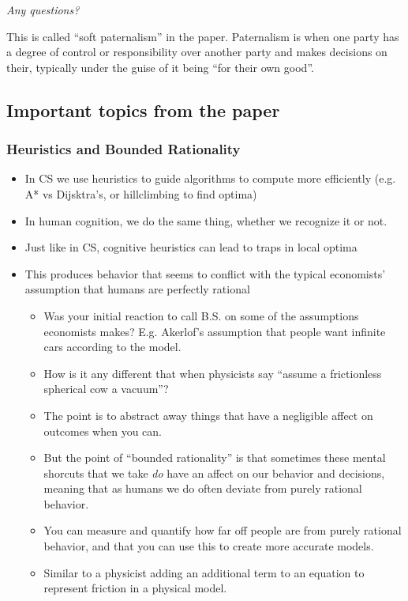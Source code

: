 \documentclass[11pt]{article}
\begin{document}
{\it Any questions?}

This is called ``soft paternalism'' in the paper. Paternalism is when one party has a degree of control or responsibility over another party and makes decisions on their, typically under the guise of it being ``for their own good''.

\subsection{Important topics from the paper}
\subsubsection{Heuristics and Bounded Rationality}

\begin{itemize}
    \item In CS we use heuristics to guide algorithms to compute more efficiently (e.g. A* vs Dijsktra's, or hillclimbing to find optima)
    \item In human cognition, we do the same thing, whether we recognize it or not. 
    \item Just like in CS, cognitive heuristics can lead to traps in local optima
    \item This produces behavior that seems to conflict with the typical economists' assumption that humans are perfectly rational
    \begin{itemize}
        \item Was your initial reaction to call B.S. on some of the assumptions economists makes? E.g. Akerlof's assumption that people want infinite cars according to the model.
        \item How is it any different that when physicists say ``assume a frictionless spherical cow a vacuum''?
        \item The point is to abstract away things that have a negligible affect on outcomes when you can.
        \item But the point of ``bounded rationality'' is that sometimes these mental shorcuts that we take \textit{do} have an affect on our behavior and decisions, meaning that as humans we do often deviate from purely rational behavior.
        \item You can measure and quantify how far off people are from purely rational behavior, and that you can use this to create more accurate models.
        \item Similar to a physicist adding an additional term to an equation to represent friction in a physical model.
    \end{itemize}
\end{itemize}
\end{document}
